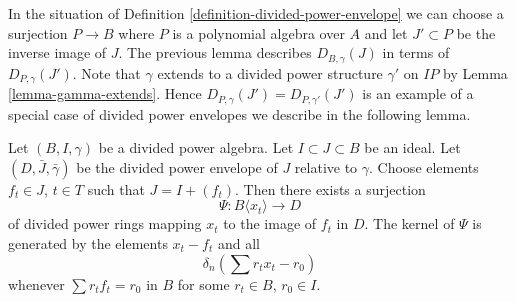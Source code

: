 \noindent
In the situation of Definition \ref{definition-divided-power-envelope}
we can choose a surjection $P \to B$ where $P$ is a polynomial
algebra over $A$ and let $J' \subset P$ be the inverse image of $J$.
The previous lemma describes $D_{B, \gamma}(J)$ in terms of
$D_{P, \gamma}(J')$. Note that $\gamma$ extends to a divided power
structure $\gamma'$ on $IP$ by Lemma \ref{lemma-gamma-extends}. Hence
$D_{P, \gamma}(J') = D_{P, \gamma'}(J')$ is an example of a special
case of divided power envelopes we describe in the following lemma.

\begin{lemma}
\label{lemma-describe-divided-power-envelope}
Let $(B, I, \gamma)$ be a divided power algebra. Let $I \subset J \subset B$
be an ideal. Let $(D, \bar J, \bar \gamma)$ be the divided power envelope
of $J$ relative to $\gamma$. Choose elements $f_t \in J$, $t \in T$ such
that $J = I + (f_t)$. Then there exists a surjection
$$
\Psi : B\langle x_t \rangle \longrightarrow D
$$
of divided power rings mapping $x_t$ to the image of $f_t$ in $D$.
The kernel of $\Psi$ is generated by the elements $x_t - f_t$ and
all
$$
\delta_n\left(\sum r_t x_t - r_0\right)
$$
whenever $\sum r_t f_t = r_0$ in $B$ for some $r_t \in B$, $r_0 \in I$.
\end{lemma}

